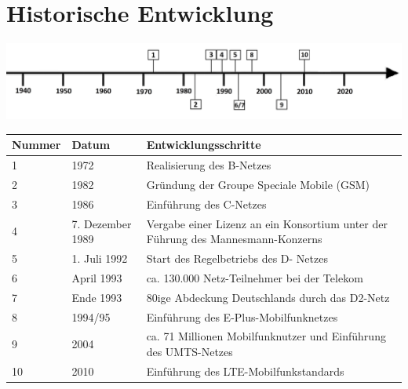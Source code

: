 \section*{Historische Entwicklung}
\includegraphics[width=\textwidth]{Kapitel/DNetz/Grafiken/Zeitstrahl}
\par
\noindent
\begin{tabular}{|p{1 cm}|p{3 cm}|p{13.55 cm}|}
	\hline
	Nummer & Datum & Entwicklungsschritte~\cite{DNetz.3}\\
	\hline
	1 & 1972 & Realisierung des B-Netzes\\
	\hline
	2 & 1982 & Gründung der Groupe Speciale Mobile (GSM)\\
	\hline
	3 & 1986 & Einführung des C-Netzes\\
	\hline
	4 & 7. Dezember 1989 & Vergabe einer Lizenz an ein Konsortium unter der Führung des Mannesmann-Konzerns\\
	\hline
	5 & 1. Juli 1992 & Start des Regelbetriebs des D- Netzes\\
	\hline
	6 & April 1993 & ca. 130.000 Netz-Teilnehmer bei der Telekom\\
	\hline
	7 & Ende 1993 & 80ige Abdeckung Deutschlands durch das D2-Netz\\
	\hline
	8 & 1994/95 &  Einführung des E-Plus-Mobilfunknetzes\\
	\hline
	9  & 2004 &  ca. 71 Millionen Mobilfunknutzer und Einführung des UMTS-Netzes\\
	\hline
	10 & 2010 & Einführung des LTE-Mobilfunkstandards\\
	\hline
\end{tabular}
\par
